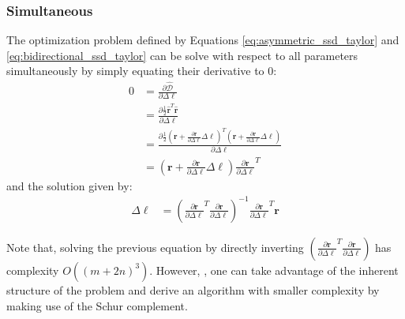 \subsubsection*{Simultaneous}
\label{sec:gauss_newton_simultaneous}

The optimization problem defined by Equations \ref{eq:asymmetric_ssd_taylor}  and \ref{eq:bidirectional_ssd_taylor} can be solve with respect to all parameters simultaneously by simply equating their derivative to $0$:
\begin{equation}
    \begin{aligned}
		0 & = \frac{\partial\hat{\mathcal{D}}}{\partial \Delta \boldsymbol{\ell}}
		\\
		& = \frac{\partial\frac{1}{2}\hat{\mathbf{r}}^T \hat{\mathbf{r}}}{\partial \Delta \boldsymbol{\ell}}
		\\
		& = \frac{\partial\frac{1}{2}(\mathbf{r} + \frac{\partial \mathbf{r}}{\partial \Delta \boldsymbol{\ell}} \Delta \boldsymbol{\ell})^T(\mathbf{r} + \frac{\partial \mathbf{r}}{\partial \Delta \boldsymbol{\ell}} \Delta \boldsymbol{\ell})}{\partial \Delta \boldsymbol{\ell}}
		\\
		& = \left( \mathbf{r} + \frac{\partial \mathbf{r}}{\partial \Delta \boldsymbol{\ell}} \Delta \boldsymbol{\ell} \right) \frac{\partial \mathbf{r}}{\partial \Delta \boldsymbol{\ell}}^T
    \label{eq:ssd_bc}
    \end{aligned}
\end{equation}
and the solution given by:
\begin{equation}
    \begin{aligned}
		\Delta \boldsymbol{\ell} & =  \left( \frac{\partial \mathbf{r}}{\partial \Delta \boldsymbol{\ell}}^T \frac{\partial \mathbf{r}}{\partial \Delta \boldsymbol{\ell}} \right)^{-1} \frac{\partial \mathbf{r}}{\partial \Delta \boldsymbol{\ell}}^T \mathbf{r}
    \label{eq:sim_solution}
    \end{aligned}
\end{equation}

Note that, solving the previous equation by directly inverting $\left( \frac{\partial \mathbf{r}}{\partial \Delta \boldsymbol{\ell}}^T \frac{\partial \mathbf{r}}{\partial \Delta \boldsymbol{\ell}} \right)$ has complexity $O((m + 2n)^3)$. However, %
, one can take advantage of the inherent structure of the problem and derive an algorithm with smaller complexity by making use of the Schur complement. 


